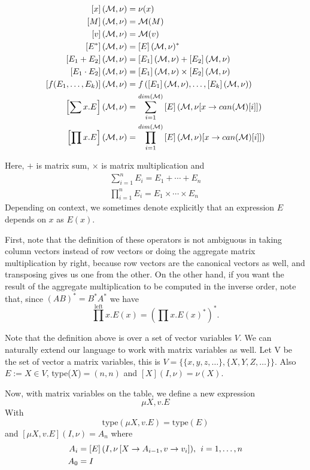 \begin{align*}
\left[ x\right](\mathcal{M},\nu)&=\nu (x)\\
\left[ M\right](\mathcal{M},\nu)&=\mathcal{M} (M) \\
\left[ v\right](\mathcal{M},\nu)&=\mathcal{M} (v) \\
\left[ E^*\right](\mathcal{M},\nu)&=\left[ E\right](\mathcal{M},\nu)^* \\
\left[ E_1+E_2\right](\mathcal{M},\nu)&= \left[ E_1\right](\mathcal{M},\nu)+\left[ E_2\right](\mathcal{M},\nu)\\
\left[ E_1\cdot E_2\right](\mathcal{M},\nu)&= \left[ E_1\right](\mathcal{M},\nu)\times \left[ E_2\right](\mathcal{M},\nu)\\
\left[ f(E_1,\ldots ,E_k)\right](\mathcal{M},\nu) &= f\left(\left[ E_1\right](\mathcal{M},\nu),\ldots , \left[  E_k\right](\mathcal{M},\nu)\right)\\
\left[ \sum x.E\right](\mathcal{M},\nu)&= \sum_{i=1}^{dim(\mathcal{M})}\left[ E\right](\mathcal{M},\nu[x\rightarrow can(\mathcal{M})[i]])\\
\left[ \prod x. E\right](\mathcal{M},\nu)&= \prod_{i=1}^{dim(\mathcal{M})}\left[ E\right](\mathcal{M},\nu)[x\rightarrow can(\mathcal{M})[i]])
\end{align*}

Here, $+$ is matrix sum, $\times$ is matrix multiplication and 
\begin{align*}
\sum_{i=1}^n E_i = E_1+\cdots + E_n \\
\prod_{i=1}^n E_i = E_1\times \cdots\times E_n
\end{align*}
Depending on context, we sometimes denote explicitly that an expression $E$ depends on $x$ as $E(x)$.

First, note that the definition of these operators is not ambiguous in taking column vectors instead of row vectors or doing the aggregate matrix multiplication by right, because row vectors are the canonical vectors as well, and transposing gives us one from the other. On the other hand, if you want the result of the aggregate multiplication to be computed in the inverse order, note that, since $(AB)^*=B^*A^*$ we have $$\prod^{\text{left}} x.E(x)=\left(\prod x.E(x)^*\right)^*.$$

Note that the definition above is over a set of vector variables $V$. We can naturally extend our language to work with matrix variables as well. Let V be the set of vector a matrix variables, this is $V=\lbrace\lbrace x, y, z, \ldots\rbrace,\lbrace X,Y,Z,\ldots\rbrace\rbrace$. Also $E:=X\in V$, type($X$)$=(n, n)$ and $\left[X\right](I,\nu)=\nu(X)$.

Now, with matrix variables on the table, we define a new expression $$\mu X, v.E$$ With $$\text{type}(\mu X,v. E) = \text{type}(E)$$ and $\left[ \mu X,v. E\right](I,\nu) = A_n$ where
\begin{align*}
A_i &= \left[ E\right](I,\nu\left[X\rightarrow A_{i-1}, v\rightarrow v_i\right]),\hspace{1ex} i= 1, \ldots, n \\
A_0 &= I
\end{align*}

